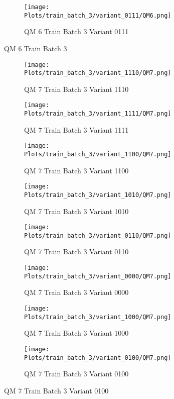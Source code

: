 \documentclass{DissertateFigs}
\begin{document}
\begin{figure}[t!]
\medskip

    \begin{subfigure}{0.47\textwidth}
    \texttt{[image: Plots/train\_batch\_3/variant\_0111/QM6.png]}
    \caption{QM 6 Train Batch 3 Variant 0111}
    \end{subfigure}
\caption{QM 6 Train Batch 3}
    \end{figure}
\clearpage
\begin{figure}[t!]
    \begin{subfigure}{0.47\textwidth}
    \texttt{[image: Plots/train\_batch\_3/variant\_1110/QM7.png]}
    \caption{QM 7 Train Batch 3 Variant 1110}
    \end{subfigure}
    \begin{subfigure}{0.47\textwidth}
    \texttt{[image: Plots/train\_batch\_3/variant\_1111/QM7.png]}
    \caption{QM 7 Train Batch 3 Variant 1111}
    \end{subfigure}

\medskip

    \begin{subfigure}{0.47\textwidth}
    \texttt{[image: Plots/train\_batch\_3/variant\_1100/QM7.png]}
    \caption{QM 7 Train Batch 3 Variant 1100}
    \end{subfigure}
    \begin{subfigure}{0.47\textwidth}
    \texttt{[image: Plots/train\_batch\_3/variant\_1010/QM7.png]}
    \caption{QM 7 Train Batch 3 Variant 1010}
    \end{subfigure}

\medskip

    \begin{subfigure}{0.47\textwidth}
    \texttt{[image: Plots/train\_batch\_3/variant\_0110/QM7.png]}
    \caption{QM 7 Train Batch 3 Variant 0110}
    \end{subfigure}
    \begin{subfigure}{0.47\textwidth}
    \texttt{[image: Plots/train\_batch\_3/variant\_0000/QM7.png]}
    \caption{QM 7 Train Batch 3 Variant 0000}
    \end{subfigure}

\medskip

    \begin{subfigure}{0.47\textwidth}
    \texttt{[image: Plots/train\_batch\_3/variant\_1000/QM7.png]}
    \caption{QM 7 Train Batch 3 Variant 1000}
    \end{subfigure}
    \begin{subfigure}{0.47\textwidth}
    \texttt{[image: Plots/train\_batch\_3/variant\_0100/QM7.png]}
    \caption{QM 7 Train Batch 3 Variant 0100}
    \end{subfigure}


\end{figure}
\end{document}
